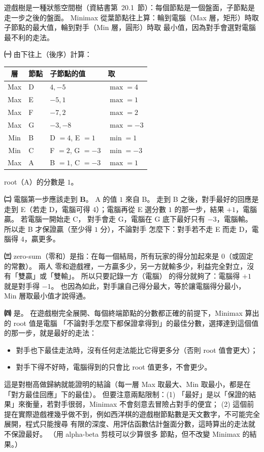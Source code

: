 \begin{pastsoln}
遊戲樹是一種狀態空間樹（資結書第~20.1~節）：每個節點是一個盤面，子節點是走一步之後的盤面。
Minimax 從葉節點往上算：輪到電腦（Max 層，矩形）時取子節點的最大值，輪到對手（Min 層，圓形）時取
最小值，因為對手會選對電腦最不利的走法。

\textbf{㈠} 由下往上（後序）計算：
\begin{center}
\small
\begin{tabular}{clll}
\toprule
層 & 節點 & 子節點的值 & 取 \\
\midrule
Max & D & $4, -5$ & $\max = 4$ \\
Max & E & $-5, 1$ & $\max = 1$ \\
Max & F & $-7, 2$ & $\max = 2$ \\
Max & G & $-3, -8$ & $\max = -3$ \\
\midrule
Min & B & D $= 4$, E $= 1$ & $\min = 1$ \\
Min & C & F $= 2$, G $= -3$ & $\min = -3$ \\
\midrule
Max & A & B $= 1$, C $= -3$ & $\max = 1$ \\
\bottomrule
\end{tabular}
\end{center}
root（A）的分數是 $1$。

\textbf{㈡} 電腦第一步應該走到 \textbf{B}。 A 的值 $1$ 來自 B。 走到 B 之後，對手最好的回應是走到
E（若走 D，電腦可得 $4$）；電腦再從 E 選分數 $1$ 的那一步，結果 $+1$，電腦贏。 若電腦一開始走 C，
對手會走 G，電腦在 G 底下最好只有 $-3$，電腦輸。 所以走 B 才保證贏（至少得 $1$ 分），不論對手
怎麼下：對手若不走 E 而走 D，電腦得 $4$，贏更多。

\textbf{㈢} zero-sum（零和）是指：在每一個結局，所有玩家的得分加起來是 $0$（或固定的常數）。 兩人
零和遊戲裡，一方贏多少，另一方就輸多少，利益完全對立，沒有「雙贏」或「雙輸」。 所以只要記錄一方（電腦）
的得分就夠了：電腦得 $+1$ 就是對手得 $-1$。 也因為如此，對手讓自己得分最大，等於讓電腦得分最小，
Min 層取最小值才說得通。

\textbf{㈣} 是。 在遊戲樹完全展開、每個終端節點的分數都正確的前提下，Minimax 算出的 root 值是電腦
「不論對手怎麼下都保證拿得到」的最佳分數，選擇達到這個值的那一步，就是最好的走法：
\begin{itemize}
\item 對手也下最佳走法時，沒有任何走法能比它得更多分（否則 root 值會更大）；
\item 對手下得不好時，電腦得到的只會比 root 值更多，不會更少。
\end{itemize}
這是對樹高做歸納就能證明的結論（每一層 Max 取最大、Min 取最小，都是在「對方最佳回應」下的最佳）。
但要注意兩點限制：(1) 「最好」是以「保證的結果」來衡量，若對手很弱，Minimax 不會刻意去冒險占對手的便宜；
(2) 這個前提在實際遊戲裡幾乎做不到，例如西洋棋的遊戲樹節點數是天文數字，不可能完全展開，程式只能搜尋
有限的深度、用評估函數估計盤面分數，這時算出的走法就不保證最好。 （用 alpha-beta 剪枝可以少算很多
節點，但不改變 Minimax 的結果。）
\end{pastsoln}
